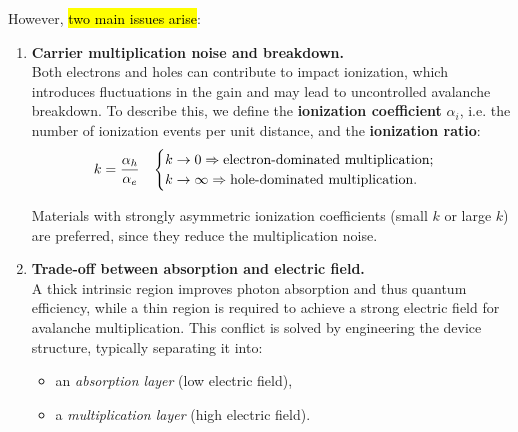 However, \hl{two main issues arise}:
\begin{enumerate}
    \item \textbf{Carrier multiplication noise and breakdown.}\\
    Both electrons and holes can contribute to impact ionization, which introduces fluctuations in the gain and may lead to uncontrolled avalanche breakdown. To describe this, we define the \textbf{ionization coefficient} $\alpha_i$, i.e. the number of ionization events per unit distance, and the \textbf{ionization ratio}:
    \begin{equation}\label{eqn:8-avalanche-photodiode-ionization-ratio}
    k = \frac{\alpha_h}{\alpha_e}
    \hspace{2ex}
    \begin{cases}
    k \to 0 \Rightarrow \text{electron-dominated multiplication};\\
    k \to \infty \Rightarrow \text{hole-dominated multiplication}.
    \end{cases}
    \end{equation}

    Materials with strongly asymmetric ionization coefficients (small $k$ or large $k$) are preferred, since they reduce the multiplication noise.

    \item \textbf{Trade-off between absorption and electric field.}\\
    A thick intrinsic region improves photon absorption and thus quantum efficiency, while a thin region is required to achieve a strong electric field for avalanche multiplication. This conflict is solved by engineering the device structure, typically separating it into:
    \begin{itemize}
        \item[--] an \textit{absorption layer} (low electric field),
        \item[--] a \textit{multiplication layer} (high electric field).
    \end{itemize}
\end{enumerate}

